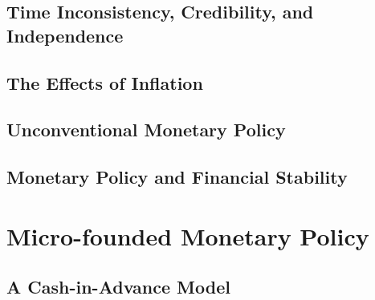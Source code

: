 \documentclass[11pt,a4paper,oneside]{book}
\begin{document}

\chapter{Time Inconsistency, Credibility, and Independence}


\chapter{The Effects of Inflation}


\chapter{Unconventional Monetary Policy}


\chapter{Monetary Policy and Financial Stability}


\part{Micro-founded Monetary Policy}
\chapter{A Cash-in-Advance Model}
\end{document}

